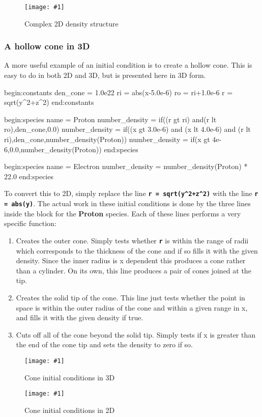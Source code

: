\documentclass[12pt,a4paper]{article}
\newcommand{\inlinecode}[1]{{\color{warwickred} \bf\texttt{#1}}}
\newcommand{\inlineemph}[1]{{\color{warwicklight} \bf{#1}}}
\newcommand{\scaledcapimage}[4]
  {{\begin{figure}[hbt!]\centering\texttt{[image: \#1]}\caption{#3}
    \label{#2} \end{figure}}}
\newenvironment{lboxverbatim}[1]{
\setlength{\FrameSep}{0pt}
\def\FrameCommand{\fboxsep=0pt \colorbox{shadecolor}}
\MakeFramed{\FrameRestore}
\vspace{-13.5pt}
\fvset{label=#1}
\boxverb
}{
\endboxverb
\vspace{-13.5pt}
\endMakeFramed
}
\begin{document}
\scaledcapimage{./images/shapetest}{densitycomplex}{Complex 2D density
  structure}{0.4}

\subsubsection{A hollow cone in 3D}
A more useful example of an initial condition is to create a hollow cone. This
is easy to do in both 2D and 3D, but is presented here in 3D form.
\begin{lboxverbatim}{ic.deck}
begin:constants
   den_cone = 1.0e22
   ri = abs(x-5.0e-6)
   ro = ri+1.0e-6
   r = sqrt(y^2+z^2)
end:constants

begin:species
   name = Proton
   number_density = if((r gt ri) and(r lt ro),den_cone,0.0)
   number_density = if((x gt 3.0e-6) and (x lt 4.0e-6) and (r lt ri),den_cone,number_density(Proton))
   number_density = if(x gt 4e-6,0.0,number_density(Proton))
end:species

begin:species
   name = Electron
   number_density = number_density(Proton) * 22.0
end:species
\end{lboxverbatim}

To convert this to 2D, simply replace the line
\inlinecode{r = sqrt(y\^{}2+z\^{}2)} with the line \inlinecode{r = abs(y)}. The
actual work in these initial conditions is done by the three lines inside the
block for the \inlineemph{Proton} species. Each of these lines performs a very
specific function:

\begin{enumerate}
\item Creates the outer cone. Simply tests whether \inlinecode{r} is within
  the range of radii which corresponds to the thickness of the cone and if so
  fills it with the given density. Since the inner radius is x dependent this
  produces a cone rather than a cylinder. On its own, this line produces a
  pair of cones joined at the tip.
\item Creates the solid tip of the cone. This line just tests whether the
  point in space is within the outer radius of the cone and within a given
  range in x, and fills it with the given density if true.
\item Cuts off all of the cone beyond the solid tip. Simply tests if x is
  greater than the end of the cone tip and sets the density to zero if so.
\end{enumerate}

\scaledcapimage{./images/3dcone}{3dcone}{Cone initial conditions in 3D}{0.4}
\scaledcapimage{./images/2dcone}{2dcone}{Cone initial conditions in 2D}{0.4}
\end{document}
